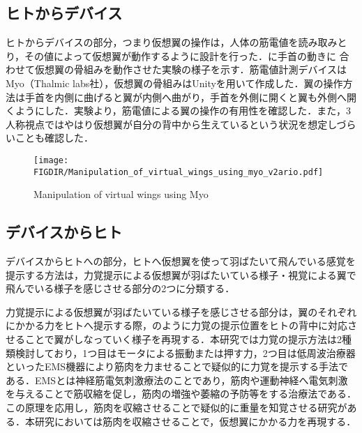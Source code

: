 \begin{small}
  \subsection{ヒトからデバイス}
    ヒトからデバイスの部分，つまり仮想翼の操作は，人体の筋電値を読み取みとり，その値によって仮想翼が動作するように設計を行った．に手首の動きに
    合わせて仮想翼の骨組みを動作させた実験の様子を示す．筋電値計測デバイスはMyo（Thalmic labs社），仮想翼の骨組みはUnityを用いて作成した．翼の操作方法は手首を内側に曲げると翼が内側へ曲がり，手首を外側に開くと翼も外側へ開くようにした．実験より，筋電値による翼の操作の有用性を確認した．また，3人称視点ではやはり仮想翼が自分の背中から生えているという状況を想定しづらいことも確認した．

    \begin{figure}[t]
      \begin{center}
        \vspace{3mm}
        \texttt{[image: \\FIGDIR/Manipulation\_of\_virtual\_wings\_using\_myo\_v2ario.pdf]}%
        \caption{Manipulation of virtual wings using Myo}
      \end{center}
    \end{figure}
    
    
  \subsection{デバイスからヒト}
    デバイスからヒトへの部分，ヒトへ仮想翼を使って羽ばたいて飛んでいる感覚を提示する方法は，力覚提示による仮想翼が羽ばたいている様子・視覚による翼で飛んでいる様子を感じさせる部分の2つに分類する．
    
    力覚提示による仮想翼が羽ばたいている様子を感じさせる部分は，翼のそれぞれにかかる力をヒトへ提示する際，のように力覚の提示位置をヒトの背中に対応させることで翼がしなっていく様子を再現する．本研究では力覚の提示方法は2種類検討しており，1つ目はモータによる振動または押す力，2つ目は低周波治療器といったEMS機器により筋肉を力ませることで疑似的に力覚を提示する手法である．EMSとは神経筋電気刺激療法のことであり，筋肉や運動神経へ電気刺激を与えることで筋収縮を促し，筋肉の増強や萎縮の予防等をする治療法である．この原理を応用し，筋肉を収縮させることで疑似的に重量を知覚させる研究がある\cite{小川剛史2017電気的筋肉刺激が重量知覚に及ぼす影響の分析}．本研究においては筋肉を収縮させることで，仮想翼にかかる力を再現する．


\end{small}
